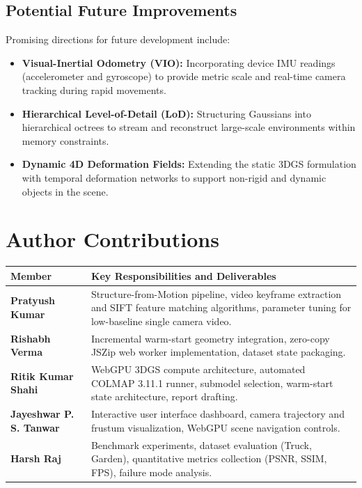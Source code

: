 \documentclass[conference]{IEEEtran}
\begin{document}
\subsection{Potential Future Improvements}
Promising directions for future development include:
\begin{itemize}
    \item \textbf{Visual-Inertial Odometry (VIO):} Incorporating device IMU readings (accelerometer and gyroscope) to provide metric scale and real-time camera tracking during rapid movements.
    \item \textbf{Hierarchical Level-of-Detail (LoD):} Structuring Gaussians into hierarchical octrees to stream and reconstruct large-scale environments within memory constraints.
    \item \textbf{Dynamic 4D Deformation Fields:} Extending the static 3DGS formulation with temporal deformation networks to support non-rigid and dynamic objects in the scene.
\end{itemize}

\section*{Author Contributions}
\begin{table}[htbp]
\centering
\begin{tabular}{lp{5.2cm}}
\toprule
\textbf{Member} & \textbf{Key Responsibilities and Deliverables} \\
\midrule
\textbf{Pratyush Kumar} & Structure-from-Motion pipeline, video keyframe extraction and SIFT feature matching algorithms, parameter tuning for low-baseline single camera video. \\
\textbf{Rishabh Verma} & Incremental warm-start geometry integration, zero-copy JSZip web worker implementation, dataset state packaging. \\
\textbf{Ritik Kumar Shahi} & WebGPU 3DGS compute architecture, automated COLMAP 3.11.1 runner, submodel selection, warm-start state architecture, report drafting. \\
\textbf{Jayeshwar P. S. Tanwar} & Interactive user interface dashboard, camera trajectory and frustum visualization, WebGPU scene navigation controls. \\
\textbf{Harsh Raj} & Benchmark experiments, dataset evaluation (Truck, Garden), quantitative metrics collection (PSNR, SSIM, FPS), failure mode analysis. \\
\bottomrule
\end{tabular}
\end{table}
\end{document}
